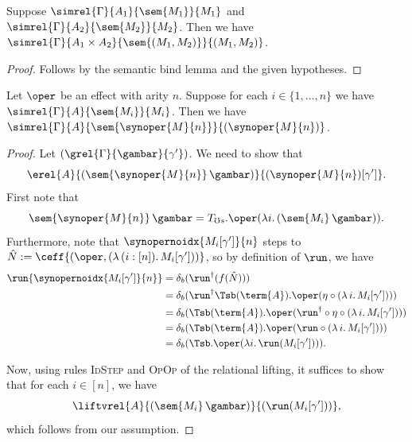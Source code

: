 \begin{lemma}
Suppose $\simrel{\Gamma}{A_1}{\sem{M_1}}{M_1}$ and $\simrel{\Gamma}{A_2}{\sem{M_2}}{M_2}$.
Then we have $\simrel{\Gamma}{A_1 \times A_2}{\sem{(M_1, M_2)}}{(M_1, M_2)}$.
\end{lemma}
\begin{proof}
    Follows by the semantic bind lemma and the given hypotheses.
\end{proof}


\begin{lemma}
    Let $\oper$ be an effect with arity $n$. Suppose for each $i \in \{1, \dots,
    n\}$ we have $\simrel{\Gamma}{A}{\sem{M_i}}{M_i}$. Then we have
    $\simrel{\Gamma}{A}{\sem{\synoper{M}{n}}}{(\synoper{M}{n})}$.
\end{lemma}
\begin{proof}
    Let $(\grel{\Gamma}{\gambar}{\gamma'})$. We need to show that
    \[ \erel{A} {(\sem{\synoper{M}{n}}\, \gambar)} {(\synoper{M}{n})[\gamma']}. \]
    First note that
    \[ \sem{\synoper{M}{n}}\, \gambar = T_{\mho s}.\oper(\lambda i.\, (\sem{M_i}\, \gambar)). \]
    Furthermore, note that $\synopernoidx{M_i[\gamma']}{n}$ steps to
    $\hat{N} := \ceff{(\oper, (\lambda\, (i : [n]).\, M_i[\gamma']))}$, so by definition of
    $\run$, we have
    \begin{align*}
        \run{\synopernoidx{M_i[\gamma']}{n}}
        &= \delta_b (\run^{\dag} {(f(\hat{N}))}) \\
        &= \delta_b (\run^{\dag} \Tsb(\term{A}).\oper(\eta \circ (\lambda\, i.\, M_i[\gamma']))) \\
        &= \delta_b (\Tsb(\term{A}).\oper(\run^{\dag} \circ \eta \circ (\lambda\, i.\, M_i[\gamma']))) \\
        &= \delta_b (\Tsb(\term{A}).\oper(\run \circ (\lambda\, i.\, M_i[\gamma']))) \\
        &= \delta_b (\Tsb.\oper(\lambda i.\, \run(M_i[\gamma']))). 
    \end{align*}

    Now, using rules \textsc{IdStep} and \textsc{OpOp} of the relational
    lifting, it suffices to show that for each $i \in [n]$, we have
    \[ \liftvrel{A}{(\sem{M_i}\, \gambar)}{(\run (M_i[\gamma']))}, \]
    which follows from our assumption.


\end{proof}

